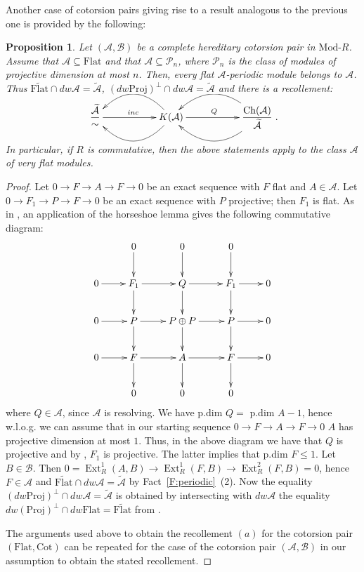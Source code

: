 \documentclass[11pt,a4paper,reqno]{amsart}
\newcommand{\Ext}{\operatorname{Ext}}
\newcommand{\A}{\mathcal{A}}
\newcommand{\B}{\mathcal{B}}
\newcommand{\clP}{\mathcal{P}}
\newcommand{\Ch}{\mathrm{Ch}}
\newcommand{\Modr}[1]{\mathrm{Mod}\textrm{-}{#1}}
\newcommand{\Flat}{\mathrm{Flat}}
\newcommand{\Cot}{\mathrm{Cot}}
\newcommand{\Proj}{\mathrm{Proj}}
\theoremstyle{plain}
\newtheorem{prop}[thm]{Proposition}
\theoremstyle{definition}
\theoremstyle{remark}
\begin{document}
Another case of cotorsion pairs giving rise to a result analogous to the previous one is provided by the following:
\begin{prop}\label{P:A-flat} Let $(\A, \B)$ be a complete hereditary cotorsion pair in $\Modr R$. Assume that $\A\subseteq \Flat$ and that $\A\subseteq \clP_n$, where $\clP_n$ is the class of modules of projective dimension at most $n$.
 Then, every flat $\A$-periodic module belongs to $\A$. Thus $\widetilde{\Flat}\cap dw \A=\tilde{\A}$, $ (dw\Proj)^\perp\cap dw\A=\tilde{\A}$ and there is a recollement:
 \vskip0.7cm
\[
\xymatrix{\dfrac{\widetilde{\A} }{\sim} \ar[rr]^{inc} &&{K(\A)} \ar@/^2pc/[ll]\ar@/_2pc/[ll] \ar[rr]^{Q}
&&{\dfrac{\Ch(\A)}{\widetilde{\A} }}\ar@/^2pc/ [ll] \ar@/_2pc/ [ll] }
.\]
\vskip0.7cm

 In particular, if $R$ is commutative, then the above statements apply
 to the class $\A$ of very flat modules. \end{prop}
 \begin{proof} Let $0\to F\to A\to F\to 0$ be an exact sequence with $F$ flat and $A\in \A$. Let $0\to F_1\to P\to F\to 0$ be an exact sequence with $P$ projective; then $F_1$ is flat. As in \cite{Sto16}, an application of the horseshoe lemma gives the following commutative diagram:
 \[\xymatrix{
&0 \ar[d]  & 0 \ar[d] & 0 \ar[d] \\
0 \ar[r] & F_1 \ar[d] \ar[r] &Q\ar[r] \ar[d] & F_1\ar[d]  \ar[r] & 0 \\
0 \ar[r] & P \ar[d] \ar[r] &P\oplus P\ar[r] \ar[d] & P\ar[d]  \ar[r] & 0  \\
0 \ar[r] & F \ar[d]\ar[r] &A\ar[r] \ar[d] & F\ar[d]  \ar[r] & 0 \\
&0 & 0 & 0
}
\]
where  $Q\in \A$, since $\A$ is resolving. We have p.dim $Q=$ p.dim $A-1$, hence w.l.o.g. we can assume that in our starting sequence  $0\to F\to A\to F\to 0$ $A$ has projective dimension at most $1$. Thus, in the above diagram we have that $Q$ is projective and by \cite{BG}, $F_1$ is projective. The latter implies that p.dim $F\leq 1$.
Let $B\in \B.$ Then $0=\Ext^1_R(A, B)\to \Ext^1_R(F, B)\to \Ext^2_R(F, B)=0$, hence $F\in \A$ and
$\widetilde{\Flat}\cap dw \A=\tilde{\A}$ by Fact~\ref{F:periodic}~(2).  Now the equality $ (dw\Proj)^\perp\cap dw\A=\tilde{\A}$ is obtained by intersecting with $dw\A$ the equality $dw(\Proj)^\perp\cap dw{\Flat}=\widetilde{\Flat}$ from \cite[Theorem 8.6]{Nee08}.

The arguments used above to obtain the recollement $(a)$ for the cotorsion pair $(\Flat, \Cot)$ can be repeated for the case of the cotorsion pair $(\A, \B)$ in our assumption to obtain the stated recollement.\end{proof}
%
\end{document}
